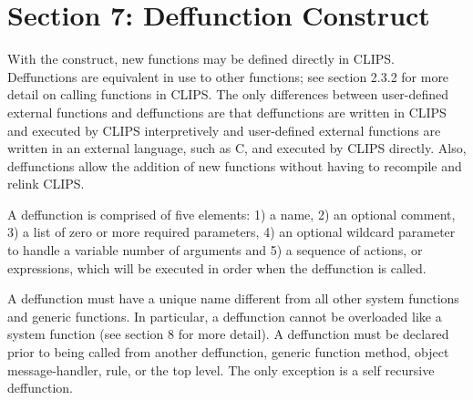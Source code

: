 \documentclass[letterpaper,10pt,english]{sphinxmanual}
\begin{document}
\chapter{Section 7: Deffunction Construct}
\label{\detokenize{deffunction:section-7-deffunction-construct}}\label{\detokenize{deffunction::doc}}
With the  construct, new functions may be defined
directly in CLIPS. Deffunctions are equivalent in use to other
functions; see section 2.3.2 for more detail on calling functions in
CLIPS. The only differences between user-defined external functions and
deffunctions are that deffunctions are written in CLIPS and executed by
CLIPS interpretively and user-defined external functions are written in
an external language, such as C, and executed by CLIPS directly. Also,
deffunctions allow the addition of new functions without having to
recompile and relink CLIPS.

A deffunction is comprised of five elements: 1) a name, 2) an optional
comment, 3) a list of zero or more required parameters, 4) an optional
wildcard parameter to handle a variable number of arguments and 5) a
sequence of actions, or expressions, which will be executed in order
when the deffunction is called.


\begin{sphinxVerbatim}[commandchars=\\\{\}]
  \PYG{p}{[}\PYG{p}{]}
  \PYGZbs{} \PYG{p}{[}\PYG{p}{]}

   
   
\end{sphinxVerbatim}

A deffunction must have a unique name different from all other system
functions and generic functions. In particular, a deffunction cannot be
overloaded like a system function (see section 8 for more detail). A
deffunction must be declared prior to being called from another
deffunction, generic function method, object message-handler, rule, or
the top level. The only exception is a self recursive deffunction.
\end{document}

